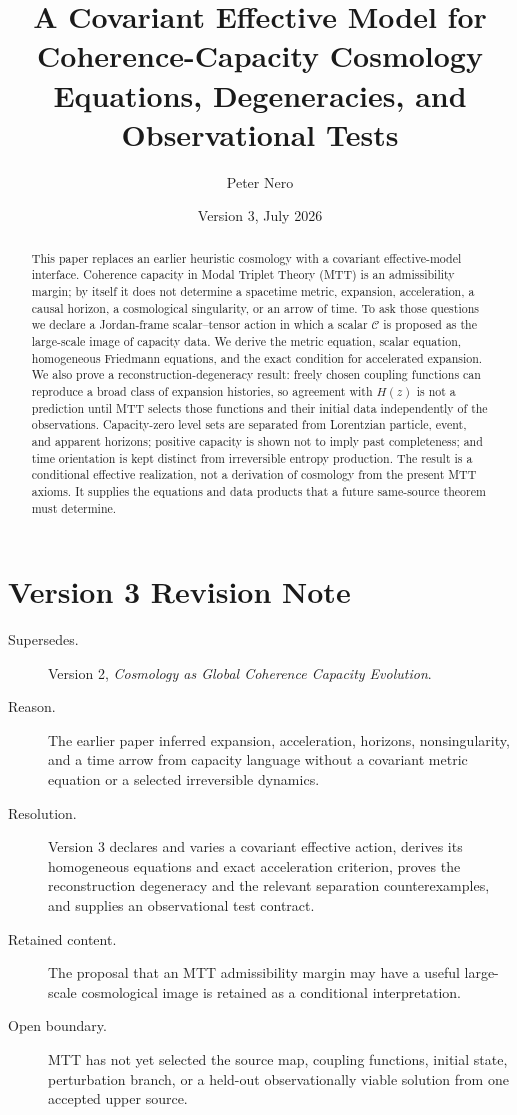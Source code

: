 \documentclass[11pt]{article}
\title{\textbf{A Covariant Effective Model for Coherence-Capacity Cosmology}\\
\large Equations, Degeneracies, and Observational Tests}
\author{Peter Nero}
\date{Version 3, July 2026}
\newcommand{\CC}{\mathcal C}
\begin{document}
\maketitle

\begin{abstract}
This paper replaces an earlier heuristic cosmology with a covariant
effective-model interface.  Coherence capacity in Modal Triplet Theory
(MTT) is an admissibility margin; by itself it does not determine a
spacetime metric, expansion, acceleration, a causal horizon, a
cosmological singularity, or an arrow of time.  To ask those questions we
declare a Jordan-frame scalar--tensor action in which a scalar
$\CC$ is proposed as the large-scale image of capacity data.  We derive
the metric equation, scalar equation, homogeneous Friedmann equations,
and the exact condition for accelerated expansion.  We also prove a
reconstruction-degeneracy result: freely chosen coupling functions can
reproduce a broad class of expansion histories, so agreement with
$H(z)$ is not a prediction until MTT selects those functions and their
initial data independently of the observations.  Capacity-zero level
sets are separated from Lorentzian particle, event, and apparent
horizons; positive capacity is shown not to imply past completeness; and
time orientation is kept distinct from irreversible entropy production.
The result is a conditional effective realization, not a derivation of
cosmology from the present MTT axioms.  It supplies the equations and
data products that a future same-source theorem must determine.
\end{abstract}

\section*{Version 3 Revision Note}

\begin{description}
\item[Supersedes.] Version 2, \emph{Cosmology as Global Coherence Capacity
Evolution}.
\item[Reason.] The earlier paper inferred expansion, acceleration,
horizons, nonsingularity, and a time arrow from capacity language without
a covariant metric equation or a selected irreversible dynamics.
\item[Resolution.] Version 3 declares and varies a covariant effective
action, derives its homogeneous equations and exact acceleration
criterion, proves the reconstruction degeneracy and the relevant
separation counterexamples, and supplies an observational test contract.
\item[Retained content.] The proposal that an MTT admissibility margin may
have a useful large-scale cosmological image is retained as a conditional
interpretation.
\item[Open boundary.] MTT has not yet selected the source map, coupling
functions, initial state, perturbation branch, or a held-out
observationally viable solution from one accepted upper source.
\end{description}
\end{document}
